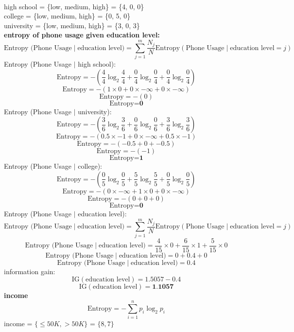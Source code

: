 \documentclass[a3paper,12pt]{extarticle} %
\begin{document}
\begin{enumerate}
    \\ high school = \{low, medium, high\} = \{4, 0, 0\}
    \\ college = \{low, medium, high\} = \{0, 5, 0\}
    \\ university = \{low, medium, high\} = \{3, 0, 3\}
    \\ \textbf{entropy of phone usage given education level:}
    \[
    \text{Entropy (Phone Usage} \mid \text{education level)} = \sum_{j=1}^m \frac{N_j}{N} \text{Entropy}(\text{Phone Usage} \mid \text{education level} = j)
    \]
    Entropy (Phone Usage $\mid$ high school):
    \[
    \text{Entropy} = -\left(\frac{4}{4} \log_2 \frac{4}{4} + \frac{0}{4} \log_2 \frac{0}{4} + \frac{0}{4} \log_2 \frac{0}{4}\right)
    \]
    \[
    \text{Entropy} = -\left(1 \times 0 + 0 \times -\infty + 0 \times -\infty\right)
    \]
    \[
    \text{Entropy} = -\left(0\right)
    \]
    \[
    \text{Entropy} = \textbf{0}
    \]
    Entropy (Phone Usage $\mid$ university):
    \[
    \text{Entropy} = -\left(\frac{3}{6} \log_2 \frac{3}{6} + \frac{0}{6} \log_2 \frac{0}{6} + \frac{3}{6} \log_2 \frac{3}{6}\right)
    \]
    \[
    \text{Entropy} = -\left(0.5 \times -1 + 0 \times -\infty + 0.5 \times -1\right)
    \]
    \[
    \text{Entropy} = -\left(-0.5 + 0 + -0.5\right)
    \]
    \[
    \text{Entropy} = -\left(-1\right)
    \]
    \[
    \text{Entropy} = \textbf{1}
    \]
    Entropy (Phone Usage $\mid$ college):
    \[
    \text{Entropy} = -\left(\frac{0}{5} \log_2 \frac{0}{5} + \frac{5}{5} \log_2 \frac{5}{5} + \frac{0}{5} \log_2 \frac{0}{5}\right)
    \]
    \[
    \text{Entropy} = -\left(0 \times -\infty + 1 \times 0 + 0 \times -\infty\right)
    \]
    \[
    \text{Entropy} = -\left(0 + 0 + 0\right)
    \]
    \[
    \text{Entropy} = \textbf{0}
    \]
    Entropy (Phone Usage $\mid$ education level):
    \[
    \text{Entropy (Phone Usage} \mid \text{education level)} = \sum_{j=1}^m \frac{N_j}{N} \text{Entropy}(\text{Phone Usage} \mid \text{education level} = j)
    \]
    \[
    \text{Entropy (Phone Usage} \mid \text{education level)} = \frac{4}{15} \times 0 + \frac{6}{15} \times 1 + \frac{5}{15} \times 0
    \]
    \[
    \text{Entropy (Phone Usage} \mid \text{education level)} = 0 + 0.4 + 0
    \]
    \[
    \text{Entropy (Phone Usage} \mid \text{education level)} = 0.4
    \]
    information gain:
    \[
    \text{IG}(\text{education level}) = 1.5057 - 0.4
    \]
    \[
    \text{IG}(\text{education level}) = \textbf{1.1057}
    \]
    \textbf{income}
    \[
    \text{Entropy} = -\sum_{i=1}^n p_i \log_2 p_i
    \]
    income = $\{\leq 50K, > 50K\}$ = $\{8, 7\}$

\end{enumerate}
\end{document}
